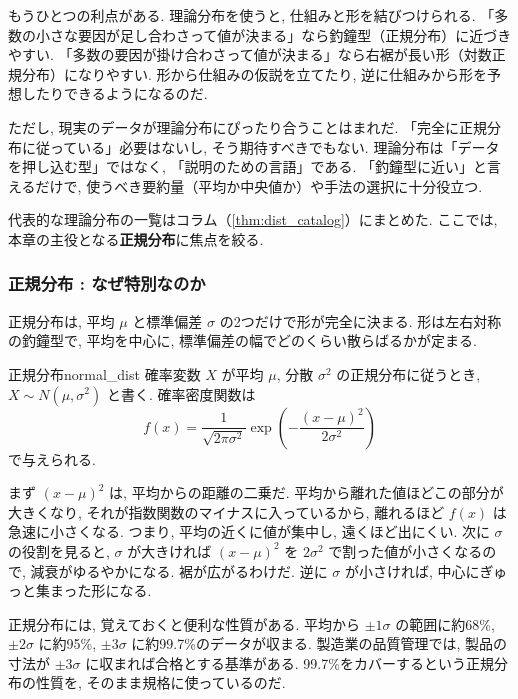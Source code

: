     もうひとつの利点がある.
    理論分布を使うと, 仕組みと形を結びつけられる.
    「多数の小さな要因が足し合わさって値が決まる」なら釣鐘型（正規分布）に近づきやすい.
    「多数の要因が掛け合わさって値が決まる」なら右裾が長い形（対数正規分布）になりやすい.
    形から仕組みの仮説を立てたり, 逆に仕組みから形を予想したりできるようになるのだ.

    ただし, 現実のデータが理論分布にぴったり合うことはまれだ.
    「完全に正規分布に従っている」必要はないし, そう期待すべきでもない.
    理論分布は「データを押し込む型」ではなく, 「説明のための言語」である.
    「釣鐘型に近い」と言えるだけで, 使うべき要約量（平均か中央値か）や手法の選択に十分役立つ.

    代表的な理論分布の一覧はコラム（\ref{thm:dist_catalog}）にまとめた.
    ここでは, 本章の主役となる\textbf{正規分布}に焦点を絞る.

    \subsubsection{正規分布 : なぜ特別なのか}

    正規分布は, 平均 $\mu$ と標準偏差 $\sigma$ の2つだけで形が完全に決まる.
    形は左右対称の釣鐘型で, 平均を中心に, 標準偏差の幅でどのくらい散らばるかが定まる.

\begin{defi}{正規分布}{normal_dist}
  確率変数 $X$ が平均 $\mu$, 分散 $\sigma^2$ の正規分布に従うとき, $X \sim N(\mu, \sigma^2)$ と書く.
  確率密度関数は
  \[
    f(x) = \frac{1}{\sqrt{2\pi\sigma^2}} \exp\!\left( -\frac{(x - \mu)^2}{2\sigma^2} \right)
  \]
  で与えられる.
\end{defi}

    まず $(x - \mu)^2$ は, 平均からの距離の二乗だ.
    平均から離れた値ほどこの部分が大きくなり, それが指数関数のマイナスに入っているから, 離れるほど $f(x)$ は急速に小さくなる.
    つまり, 平均の近くに値が集中し, 遠くほど出にくい.
    次に $\sigma$ の役割を見ると, $\sigma$ が大きければ $(x - \mu)^2$ を $2\sigma^2$ で割った値が小さくなるので, 減衰がゆるやかになる.
    裾が広がるわけだ.
    逆に $\sigma$ が小さければ, 中心にぎゅっと集まった形になる.

    正規分布には, 覚えておくと便利な性質がある.
    平均から $\pm 1\sigma$ の範囲に約68\%, $\pm 2\sigma$ に約95\%, $\pm 3\sigma$ に約99.7\%のデータが収まる.
    製造業の品質管理では, 製品の寸法が $\pm 3\sigma$ に収まれば合格とする基準がある.
    99.7\%をカバーするという正規分布の性質を, そのまま規格に使っているのだ.

